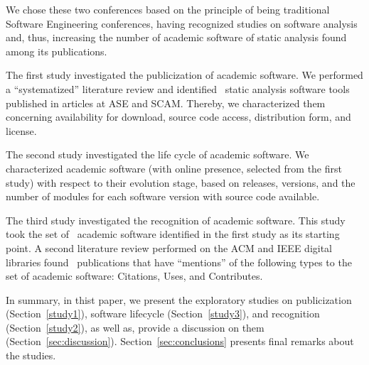 We chose these two conferences based on the principle of being traditional Software Engineering conferences, having recognized studies on software analysis and, thus, increasing the number of academic software of static analysis found among its publications.

The first study investigated the publicization of academic software.
We performed
a ``systematized'' literature review \cite{2009:grant}
and identified \SoftwareCount \ static analysis software tools
published in articles at ASE and SCAM.
Thereby, we characterized them concerning availability for download,
source code access, distribution form, and license.

The second study investigated the life cycle of academic software. We
characterized academic software (with online presence,
selected from the first study)
with respect to their evolution stage,
based on releases, versions, and the
number of modules for each software version with source code available.

The third study investigated the recognition of academic software. This study
took the set of \SoftwareCount \ academic software identified in the first
study as its starting point. A second literature review performed on the ACM
and IEEE digital libraries found \SearchUniqueCount \ publications that have
``mentions'' of the following types to the set of academic software:
Citations, Uses, and Contributes.

In summary, in thist paper, we present the exploratory studies on publicization
(Section~\ref{study1}), software lifecycle (Section~\ref{study3}), and
recognition (Section~\ref{study2}), as well as, provide a discussion on them
(Section~\ref{sec:discussion}).  Section~\ref{sec:conclusions} presents final
remarks about the studies.
